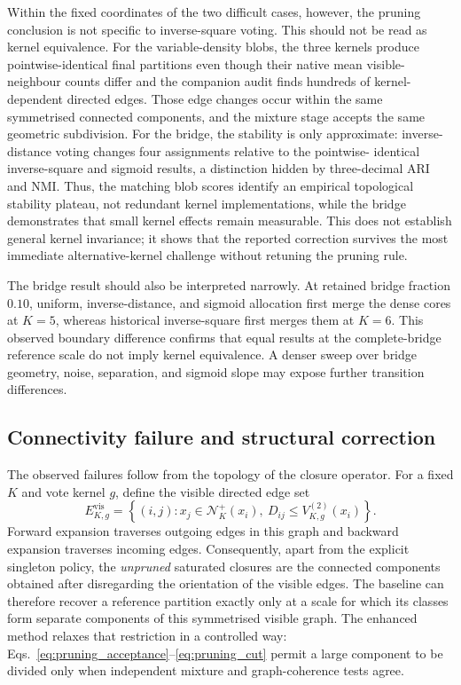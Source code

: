 \documentclass[pdflatex,sn-mathphys-num]{sn-jnl}
\newcommand{\calN}{\mathcal{N}}
\begin{document}
Within the fixed coordinates of the two difficult cases, however, the pruning
conclusion is not specific to inverse-square voting.  This should not be read
as kernel equivalence.  For the variable-density blobs, the three kernels
produce pointwise-identical final partitions even though their native mean
visible-neighbour counts differ and the companion audit finds hundreds of
kernel-dependent directed edges.  Those edge changes occur within the same
symmetrised connected components, and the mixture stage accepts the same
geometric subdivision.  For the bridge, the stability is only approximate:
inverse-distance voting changes four assignments relative to the pointwise-
identical inverse-square and sigmoid results, a distinction hidden by
three-decimal ARI and NMI\@.  Thus,
the matching blob scores identify an empirical topological stability plateau,
not redundant kernel implementations, while the bridge demonstrates that
small kernel effects remain measurable.  This does not establish general
kernel invariance; it shows that the reported correction survives the most
immediate alternative-kernel challenge without retuning the pruning rule.

The bridge result should also be interpreted narrowly.  At retained bridge
fraction $0.10$, uniform, inverse-distance, and sigmoid allocation first merge
the dense cores at $K=5$, whereas historical inverse-square first merges them
at $K=6$.  This observed boundary difference confirms that equal results at
the complete-bridge reference scale do not imply kernel equivalence.  A denser
sweep over bridge geometry, noise, separation, and sigmoid slope may expose
further transition differences.

\subsection{Connectivity failure and structural correction}

The observed failures follow from the topology of the closure operator.  For a
fixed $K$ and vote kernel $g$, define the visible directed edge set
\begin{equation}
E^{\mathrm{vis}}_{K,g}=\left\{(i,j):
x_j\in\calN_K^+(x_i),\ D_{ij}\leq V_{K,g}^{(2)}(x_i)\right\}.
\label{eq:visible_edge_set}
\end{equation}
Forward expansion traverses outgoing edges in this graph and backward
expansion traverses incoming edges.  Consequently, apart from the explicit
singleton policy, the \emph{unpruned} saturated closures are the connected
components obtained after disregarding the orientation of the visible edges.
The baseline can therefore recover a reference partition exactly only at a
scale for which its classes form separate components of this symmetrised
visible graph.  The enhanced method relaxes that restriction in a controlled
way: Eqs.~\eqref{eq:pruning_acceptance}--\eqref{eq:pruning_cut} permit a large
component to be divided only when independent mixture and graph-coherence
tests agree.
\end{document}
